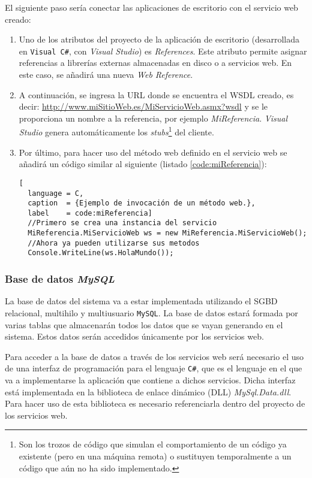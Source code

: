 El siguiente paso sería conectar las aplicaciones de escritorio con el
servicio web creado:
\begin{enumerate}
\item Uno de los atributos del proyecto de la aplicación de escritorio
(desarrollada en \texttt{Visual C\#}, con \emph{Visual Studio}) es
\emph{References}. Este atributo permite asignar referencias a librerías
externas almacenadas en disco o a servicios web. En este caso, se añadirá una
nueva \emph{Web Reference}.
\item A continuación, se ingresa la \acs{URL} donde se encuentra el \acs{WSDL}
creado, es decir: \url{http://www.miSitioWeb.es/MiServicioWeb.asmx?wsdl} y se
le proporciona un nombre a la referencia, por ejemplo \emph{MiReferencia}.
\emph{Visual Studio} genera automáticamente los \emph{stubs}\footnote{Son los
trozos de código que simulan el comportamiento de un código ya existente (pero
en una máquina remota) o sustituyen temporalmente a un código que aún no ha
sido implementado.} del cliente.
\item Por último, para hacer uso del método web definido en el servicio
web se añadirá un código similar al siguiente (listado
\ref{code:miReferencia}):

\begin{lstlisting}[
  language = C,
  caption  = {Ejemplo de invocación de un método web.},
  label    = code:miReferencia]
  //Primero se crea una instancia del servicio
  MiReferencia.MiServicioWeb ws = new MiReferencia.MiServicioWeb();
  //Ahora ya pueden utilizarse sus metodos
  Console.WriteLine(ws.HolaMundo());
\end{lstlisting}

\end{enumerate}

    \subsubsection{Base de datos \emph{MySQL}}
La base de datos del sistema va a estar implementada utilizando el \acs{SGBD}
relacional, multihilo y multiusuario \texttt{MySQL}. La base de datos
estará formada por varias tablas que almacenarán todos los datos que se
vayan generando en el sistema. Estos datos serán accedidos únicamente por
los servicios web.

Para acceder a la base de datos a través de los servicios web será necesario
el uso de una interfaz de programación para el lenguaje \texttt{C\#}, que es
el lenguaje en el que va a implementarse la aplicación que contiene a dichos
servicios. Dicha interfaz está implementada en la biblioteca de enlace
dinámico (\acs{DLL}) \emph{MySql.Data.dll}. Para hacer uso de esta biblioteca
es necesario referenciarla dentro del proyecto de los servicios web.

